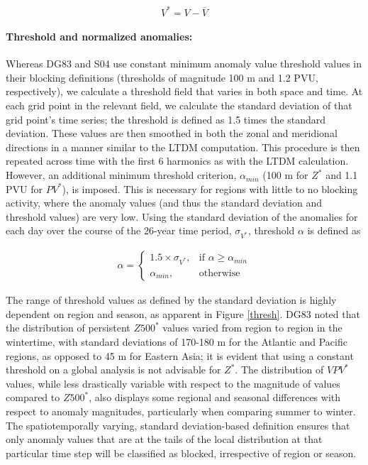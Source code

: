 \documentclass[smallextended]{svjour3}       %
\numberwithin{equation}{section}
\begin{document}
\begin{equation}
V^* = V-\overline{V}
\end{equation}

\paragraph{Threshold and normalized anomalies:} Whereas DG83 and S04 use constant minimum anomaly value threshold values in their blocking definitions (thresholds of magnitude 100 m and 1.2 PVU, respectively), {\color{blue}%
we calculate a threshold field that varies in both space and time. At each grid point in the relevant field, we calculate the standard deviation of that grid point's time series; the threshold is defined as 1.5 times the standard deviation.}
{\color{blue}%
These values are then} smoothed in both the zonal and meridional directions in a manner similar to the LTDM computation. This procedure is then repeated across time with the first 6 harmonics as with the LTDM calculation. However, an additional minimum threshold criterion, {\color{blue}$\alpha_{min}$} (100 m for $Z^*$ and 1.1 PVU for $PV^*$), is imposed. This is necessary for regions with little to no blocking activity, where the anomaly values (and thus the standard deviation and threshold values) are very low. Using the standard deviation of the anomalies for each day over the course of the 26-year time period, $\sigma_{V^*}$, threshold $\alpha$ is defined as 

\begin{eqnarray}
\alpha =  
\begin{cases}
    1.5\times \sigma_{V^*},& \text{if } \alpha\geq \alpha_{min}\\
    \alpha_{min},              & \text{otherwise}
\end{cases}
\end{eqnarray}


The range of threshold values as defined by the standard deviation is highly dependent on region and season, as apparent in Figure \ref{thresh}. DG83 noted that the distribution of persistent $Z500^*$ values varied from region to region in the wintertime, with standard deviations of 170-180 m for the Atlantic and Pacific regions, as opposed to 45 m for Eastern Asia; it is evident that using a constant threshold on a global analysis is not advisable for $Z^*$. The distribution of $VPV^*$ values, while less drastically variable with respect to the magnitude of values compared to $Z500^*$, also displays some regional and seasonal differences with respect to anomaly magnitudes, particularly when comparing summer to winter. The spatiotemporally varying, standard deviation-based definition ensures that only anomaly values that are at the tails of the local distribution at that particular time step will be classified as blocked, irrespective of region or season.  
\end{document}
